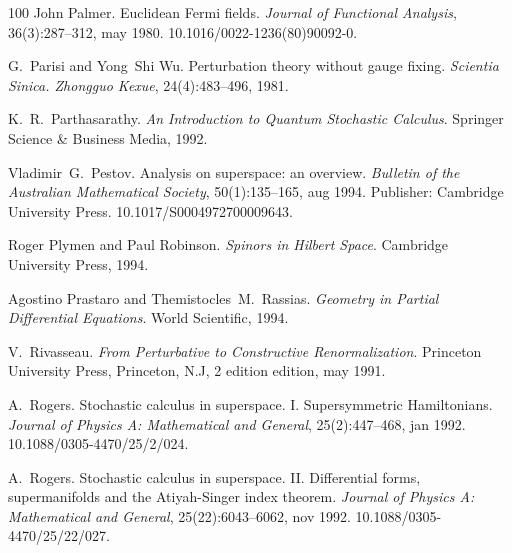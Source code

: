 \documentclass{article}
\newcommand{\tmtextit}[1]{{\itshape{#1}}}
\begin{document}
\begin{thebibliography}{100}
  John Palmer. {\newblock}Euclidean Fermi
  fields. {\newblock}\tmtextit{Journal of Functional Analysis},
  36(3):287--312, may 1980.
  {\newblock}\href{Https://doi.org/10.1016/0022-1236(80)90092-0}{}10.1016/0022-1236(80)90092-0.{\newblock}
  
  G.~Parisi  and  Yong~Shi Wu.
  {\newblock}Perturbation theory without gauge fixing.
  {\newblock}\tmtextit{Scientia Sinica. Zhongguo Kexue}, 24(4):483--496,
  1981.{\newblock}
  
  K.~R.~Parthasarathy.
  {\newblock}\tmtextit{An Introduction to Quantum Stochastic Calculus}.
  {\newblock}Springer Science \& Business Media, 1992.{\newblock}
  
  Vladimir~G.~Pestov. {\newblock}Analysis
  on superspace: an overview. {\newblock}\tmtextit{Bulletin of the Australian
  Mathematical Society}, 50(1):135--165, aug 1994. {\newblock}Publisher:
  Cambridge University Press.
  \href{https://doi.org/10.1017/S0004972700009643}{}10.1017/S0004972700009643.{\newblock}
  
  Roger Plymen  and  Paul Robinson.
  {\newblock}\tmtextit{Spinors in Hilbert Space}. {\newblock}Cambridge
  University Press, 1994.{\newblock}
  
  Agostino Prastaro  and 
  Themistocles~M.~Rassias. {\newblock}\tmtextit{Geometry in Partial
  Differential Equations}. {\newblock}World Scientific, 1994.{\newblock}
  
  V.~Rivasseau.
  {\newblock}\tmtextit{From Perturbative to Constructive Renormalization}.
  {\newblock}Princeton University Press, Princeton, N.J, 2 edition  edition,
  may 1991.{\newblock}
  
  A.~Rogers. {\newblock}Stochastic
  calculus in superspace. I. Supersymmetric Hamiltonians.
  {\newblock}\tmtextit{Journal of Physics A: Mathematical and General},
  25(2):447--468, jan 1992.
  {\newblock}\href{Https://doi.org/10.1088/0305-4470/25/2/024}{}10.1088/0305-4470/25/2/024.{\newblock}
  
  A.~Rogers. {\newblock}Stochastic
  calculus in superspace. II. Differential forms, supermanifolds and the
  Atiyah-Singer index theorem. {\newblock}\tmtextit{Journal of Physics A:
  Mathematical and General}, 25(22):6043--6062, nov 1992.
  {\newblock}\href{Https://doi.org/10.1088/0305-4470/25/22/027}{}10.1088/0305-4470/25/22/027.{\newblock}
  

\end{thebibliography}
\end{document}
